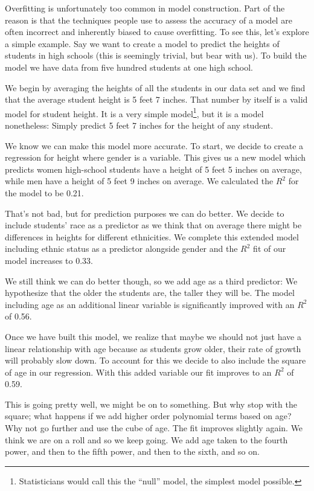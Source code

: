 \documentclass[]{memoir}
\begin{document}
Overfitting is unfortunately too common in model construction. Part of
the reason is that the techniques people use to assess the accuracy of a
model are often incorrect and inherently biased to cause overfitting. To
see this, let's explore a simple example. Say we want to create a model
to predict the heights of students in high schools (this is seemingly
trivial, but bear with us). To build the model we have data from five
hundred students at one high school.

We begin by averaging the heights of all the students in our data set
and we find that the average student height is 5 feet 7 inches. That
number by itself is a valid model for student height. It is a very
simple model\footnote{Statisticians would call this the ``null'' model,
  the simplest model possible.}, but it is a model nonetheless: Simply
predict 5 feet 7 inches for the height of any student.

We know we can make this model more accurate. To start, we decide to
create a regression for height where gender is a variable. This gives us
a new model which predicts women high-school students have a height of 5
feet 5 inches on average, while men have a height of 5 feet 9 inches on
average. We calculated the $R^2$ for the model to be 0.21.

That's not bad, but for prediction purposes we can do better. We decide
to include students' race as a predictor as we think that on average
there might be differences in heights for different ethnicities. We
complete this extended model including ethnic status as a predictor
alongside gender and the $R^2$ fit of our model increases to 0.33.

We still think we can do better though, so we add age as a third
predictor: We hypothesize that the older the students are, the taller
they will be. The model including age as an additional linear variable
is significantly improved with an $R^2$ of 0.56.

Once we have built this model, we realize that maybe we should not just
have a linear relationship with age because as students grow older,
their rate of growth will probably slow down. To account for this we
decide to also include the square of age in our regression. With this
added variable our fit improves to an $R^2$ of 0.59.

This is going pretty well, we might be on to something. But why stop
with the square; what happens if we add higher order polynomial terms
based on age? Why not go further and use the cube of age. The fit
improves slightly again. We think we are on a roll and so we keep going.
We add age taken to the fourth power, and then to the fifth power, and
then to the sixth, and so on.
\end{document}
